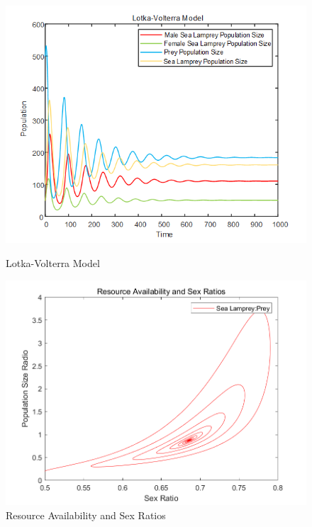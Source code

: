 \documentclass[12pt]{article}  %
\begin{document}
\begin{figure}[htbp]
	\begin{minipage}[b]{0.5\linewidth}
		\centering
		\includegraphics[width=\linewidth]{img/Lotka-Volterra Model.png}
		\caption{Lotka-Volterra Model}
	\end{minipage}%
	\begin{minipage}[b]{0.5\linewidth}
		\centering
		\includegraphics[width=\linewidth]{img/Resource Availability and Sex Ratios.png}
		\caption{Resource Availability and Sex Ratios}
	\end{minipage}
\end{figure}
\end{document}
